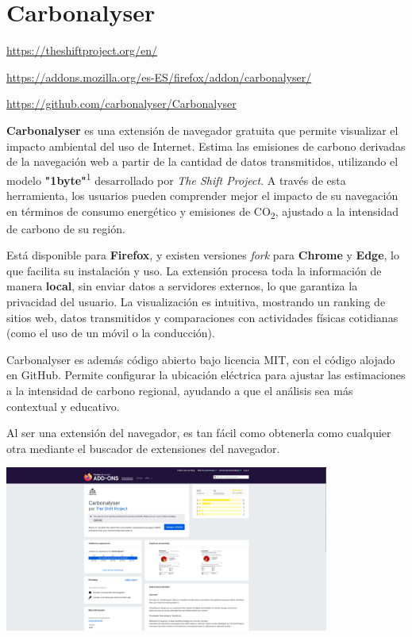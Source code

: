 \documentclass[12pt,a4paper]{report}
\begin{document}
\section*{Carbonalyser}

\href{https://theshiftproject.org/en/}{https://theshiftproject.org/en/}

\href{https://addons.mozilla.org/es-ES/firefox/addon/carbonalyser/}{https://addons.mozilla.org/es-ES/firefox/addon/carbonalyser/}

\href{https://github.com/carbonalyser/Carbonalyser}{https://github.com/carbonalyser/Carbonalyser}

\textbf{Carbonalyser} es una extensión de navegador gratuita que permite visualizar el impacto ambiental del uso de Internet. Estima las emisiones de carbono derivadas de la navegación web a partir de la cantidad de datos transmitidos, utilizando el modelo \textbf{"1byte"}\textsuperscript{1} desarrollado por \textit{The Shift Project}. A través de esta herramienta, los usuarios pueden comprender mejor el impacto de su navegación en términos de consumo energético y emisiones de CO\textsubscript{2}, ajustado a la intensidad de carbono de su región.

Está disponible para \textbf{Firefox}, y existen versiones \textit{fork} para \textbf{Chrome} y \textbf{Edge}, lo que facilita su instalación y uso. La extensión procesa toda la información de manera \textbf{local}, sin enviar datos a servidores externos, lo que garantiza la privacidad del usuario. La visualización es intuitiva, mostrando un ranking de sitios web, datos transmitidos y comparaciones con actividades físicas cotidianas (como el uso de un móvil o la conducción).

Carbonalyser es además código abierto bajo licencia MIT, con el código alojado en GitHub. Permite configurar la ubicación eléctrica para ajustar las estimaciones a la intensidad de carbono regional, ayudando a que el análisis sea más contextual y educativo.

Al ser una extensión del navegador, es tan fácil como obtenerla como cualquier otra mediante el buscador de extensiones del navegador.

\begin{center}
  \includegraphics[width=0.8\textwidth]{imagenes/Carbonalyser_1.png}
\end{center}
\end{document}
